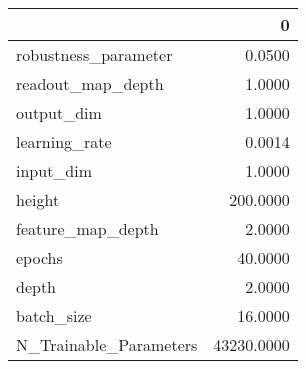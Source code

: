 \begin{tabular}{lr}
\toprule
{} &           0 \\
\midrule
robustness\_parameter   &      0.0500 \\
readout\_map\_depth      &      1.0000 \\
output\_dim             &      1.0000 \\
learning\_rate          &      0.0014 \\
input\_dim              &      1.0000 \\
height                 &    200.0000 \\
feature\_map\_depth      &      2.0000 \\
epochs                 &     40.0000 \\
depth                  &      2.0000 \\
batch\_size             &     16.0000 \\
N\_Trainable\_Parameters &  43230.0000 \\
\bottomrule
\end{tabular}
